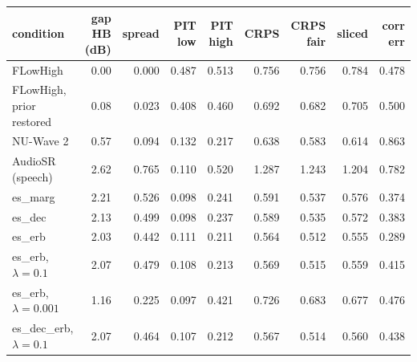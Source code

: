 \begin{tabular}{lrrrrrrrr}
\toprule
condition & gap HB (dB) & spread & PIT low & PIT high & CRPS & CRPS fair & sliced & corr err \\
\midrule
FLowHigh & 0.00 & 0.000 & 0.487 & 0.513 & 0.756 & 0.756 & 0.784 & 0.478 \\
FLowHigh, prior restored & 0.08 & 0.023 & 0.408 & 0.460 & 0.692 & 0.682 & 0.705 & 0.500 \\
NU-Wave 2 & 0.57 & 0.094 & 0.132 & 0.217 & 0.638 & 0.583 & 0.614 & 0.863 \\
AudioSR (speech) & 2.62 & 0.765 & 0.110 & 0.520 & 1.287 & 1.243 & 1.204 & 0.782 \\
es\_marg & 2.21 & 0.526 & 0.098 & 0.241 & 0.591 & 0.537 & 0.576 & 0.374 \\
es\_dec & 2.13 & 0.499 & 0.098 & 0.237 & 0.589 & 0.535 & 0.572 & 0.383 \\
es\_erb & 2.03 & 0.442 & 0.111 & 0.211 & 0.564 & 0.512 & 0.555 & 0.289 \\
es\_erb, $\lambda{=}0.1$ & 2.07 & 0.479 & 0.108 & 0.213 & 0.569 & 0.515 & 0.559 & 0.415 \\
es\_erb, $\lambda{=}0.001$ & 1.16 & 0.225 & 0.097 & 0.421 & 0.726 & 0.683 & 0.677 & 0.476 \\
es\_dec\_erb, $\lambda{=}0.1$ & 2.07 & 0.464 & 0.107 & 0.212 & 0.567 & 0.514 & 0.560 & 0.438 \\
\bottomrule
\end{tabular}
